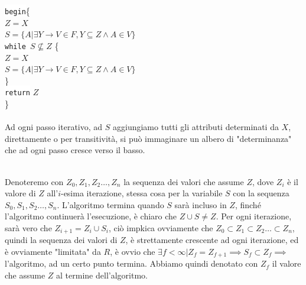 \documentclass[12pt, letterpaper]{article}
\newcommand{\codee}[1]{\colorbox{white}{\texttt{#1}}}
\newcommand{\acc}{\\\hphantom{}\\}
\begin{document}
\hphantom{ident}\codee{begin}\{\\
\hphantom{ident}\hphantom{ident}\(Z=X\)\\
\hphantom{ident}\hphantom{ident}\(S=\{A|\exists Y\rightarrow V\in F,Y\subseteq Z\land A\in V\}\)\\
\hphantom{ident}\hphantom{ident}\codee{while }\(S \nsubseteq  Z\) \{\\
\hphantom{ident}\hphantom{ident}\hphantom{ident}\(Z=X\)\\
\hphantom{ident}\hphantom{ident}\hphantom{ident}\(S=\{A|\exists Y\rightarrow V\in F,Y\subseteq Z\land A\in V\}\)\\
\hphantom{ident}\hphantom{ident}\}\\
\hphantom{ident}\codee{return} \(Z\)\\\hphantom{ident}\}\\\hphantom{}\\
Ad ogni passo iterativo, ad \(S\) aggiungiamo tutti gli attributi determinati da \(X\), direttamente 
o per transitività, si può immaginare un albero di "determinanza" che ad ogni passo cresce verso il basso.
\begin{figure}[h]
\end{figure}\\
Denoteremo con \(Z_0,Z_1,Z_2\dots,Z_n\) la sequenza dei valori che assume \(Z\), dove \(Z_i\) è il valore 
di \(Z\) all'\(i\)-esima iterazione, stessa cosa per la variabile \(S\) con la sequenza \(S_0,S_1,S_2\dots,S_n\). L'algoritmo 
termina quando \(S\) sarà incluso in \(Z\), finché l'algoritmo continuerà l'esecuzione, è chiaro che 
\(Z\cup S\ne Z\). Per ogni iterazione, sarà vero che \(Z_{i+1}=Z_i\cup S_i\), ciò impkica ovviamente che 
\(Z_0\subset Z_1\subset Z_2\dots\subset Z_n\), quindi la sequenza dei valori di \(Z\), è strettamente crescente ad ogni iterazione, 
ed è ovviamente "limitata" da \(R\), è ovvio che \(\exists f<\infty|Z_f=Z_{f+1}\implies S_f\subset Z_f\implies \) l'algoritmo, 
ad un certo punto termina. Abbiamo quindi denotato con \(Z_f\) il valore che assume \(Z\) al termine dell'algoritmo.\acc 
\end{document}
